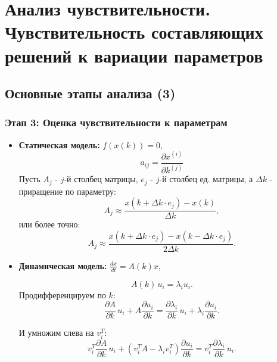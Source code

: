 	\newpage
	
	\section{Анализ чувствительности. Чувствительность составляющих решений к вариации параметров}
	\subsection{Основные этапы анализа (3)}
	\subsubsection{Этап 3: Оценка чувствительности к параметрам}
	\begin{itemize}[leftmargin=1em]
		\item \textbf{Статическая модель:} \(f(x(k)) = 0\),
		\begin{equation}
			a_{ij} = \frac{\partial x^{(i)}}{\partial k^{(j)}}
		\end{equation}
		Пусть $A_j$ - $j$-й столбец матрицы, $e_j$ - 
		$j$-й столбец ед. матрицы, а $\Delta k$ - приращение по параметру:
		\begin{equation}
			 A_j \approx \frac{x(k + \Delta k \cdot e_j) - x(k)}{\Delta k},
		\end{equation}
		или более точно:
		\begin{equation}
			A_j \approx \frac{x(k + \Delta k \cdot e_j) - x(k - \Delta k \cdot e_j)}{2 \Delta k}.
		\end{equation}
		\item \textbf{Динамическая модель:} \(\frac{d x}{d t} = A(k) x\),
		
		\begin{equation}
			A(k) \, u_i = \lambda_i u_i.
		\end{equation}
		Продифференцируем по $k$:
		\begin{equation}
			\frac{\partial A}{\partial k} \, u_i + A \frac{\partial u_i}{\partial k} =
			\frac{\partial \lambda_i}{\partial k} \, u_i + \lambda_i \frac{\partial u_i}{\partial k}. \tag{23}
		\end{equation}
		
		И умножим слева на $v_i^T$:
		\begin{equation}
			v_i^T \frac{\partial A}{\partial k} \, u_i +
			\left( v_i^T A - \lambda_i v_i^T \right)
			\frac{\partial u_i}{\partial k} =
			v_i^T \frac{\partial \lambda_i}{\partial k} \, u_i. \tag{24}
		\end{equation}
		

\end{itemize}
